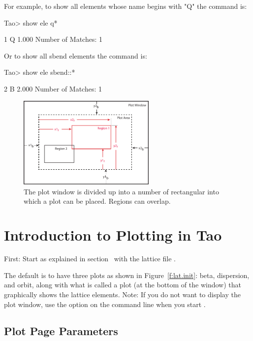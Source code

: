 \documentclass{hitec}
\newcommand{\Section}[1]{\section{#1}\vspace*{-1ex}}
\begin{document}
For example, to show all elements whose name begins with "Q" the command is:
\begin{code}
Tao> show ele q*

         1  Q                                                1.000
Number of Matches: 1
\end{code}

Or to show all sbend elements the command is:
\begin{code}  
Tao> show ele sbend::*

         2  B                                                2.000
Number of Matches: 1
\end{code}

\begin{figure}[b]
  \centering
  \includegraphics[width=0.6\textwidth]{plot-page.pdf}
  \caption{The plot window is divided up into a number of rectangular  into
which a plot  can be placed. Regions can overlap.}
  \label{f:plot.regions}
\end{figure}

\Section{Introduction to Plotting in Tao}

First: Start \tao as explained in section~ with the lattice file
.

The default is to have three plots as shown in Figure~\ref{f:lat.init}: beta, dispersion, and
orbit, along with what is called a  plot (at the bottom of the window) that
graphically shows the lattice elements. Note: If you do not want \tao to display the plot window,
use the  option on the command line when you start \tao.

\subsection{Plot Page Parameters}
\end{document}
